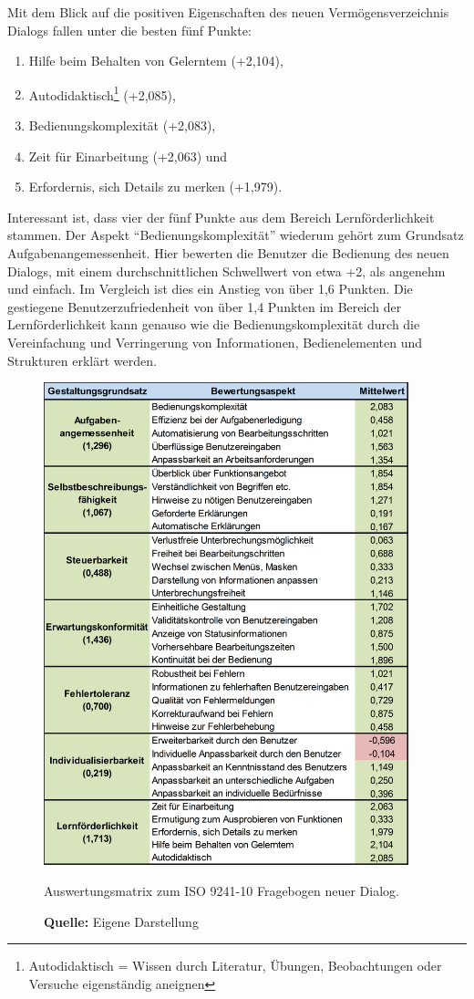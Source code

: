 Mit dem Blick auf die positiven Eigenschaften des neuen Vermögensverzeichnis Dialogs fallen unter die besten fünf Punkte:
\begin{enumerate}
    \setlength{\itemsep}{0pt}
    \setlength{\parskip}{3pt}
    \setlength{\parsep}{2pt}
    \item Hilfe beim Behalten von Gelerntem (+2,104),
    \item Autodidaktisch\footnote{Autodidaktisch = Wissen durch Literatur, Übungen, Beobachtungen oder Versuche eigenständig aneignen } (+2,085),
    \item Bedienungskomplexität (+2,083),
    \item Zeit für Einarbeitung (+2,063) und
    \item Erfordernis, sich Details zu merken (+1,979).
\end{enumerate}
Interessant ist, dass vier der fünf Punkte aus dem Bereich Lernförderlichkeit stammen. Der Aspekt \enquote{Bedienungskomplexität} wiederum gehört zum Grundsatz Aufgabenangemessenheit. Hier bewerten die Benutzer die Bedienung des neuen Dialogs, mit einem durchschnittlichen Schwellwert von etwa +2, als angenehm und einfach. Im Vergleich ist dies ein Anstieg von über 1,6 Punkten. Die gestiegene Benutzerzufriedenheit von über 1,4 Punkten im Bereich der Lernförderlichkeit kann genauso wie die Bedienungskomplexität durch die Vereinfachung und Verringerung von Informationen, Bedienelementen und Strukturen erklärt werden. 
\begin{figure}[H]
  \centering
  \includegraphics[width=400px]{img/Auswertungsmatrix_Neuer_Dialog.PNG}
  \caption{Auswertungsmatrix zum ISO 9241-10 Fragebogen neuer Dialog.}
  \caption*{\textbf{Quelle:} Eigene Darstellung}
  \label{fig:auswertungsmatrixNeuerDialog}
\end{figure}
